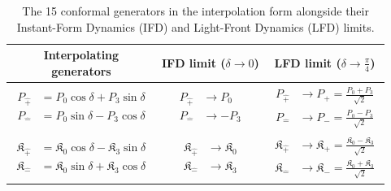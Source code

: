 \documentclass[foundations,article,submit,pdftex,moreauthors]{Definitions/mdpi}
\begin{document}
\begin{table}[htpb!]
\centering
\renewcommand{\arraystretch}{2} %
\caption{The 15 conformal generators in the interpolation form alongside their Instant-Form Dynamics (IFD) and Light-Front Dynamics (LFD) limits.}
\label{tab:generator_limits}
\begin{tabular}{@{}ccc@{}}
\toprule
\makecell{\textbf{Interpolating} \\ \textbf{generators}} & 
\makecell{\textbf{IFD limit} \\ ($\delta \to 0$)} & 
\makecell{\textbf{LFD limit} \\ ($\delta \to \frac{\pi}{4}$)} \\
\midrule

$\begin{aligned}
P_{\hat{+}} &= P_0\cos\delta + P_3\sin\delta \\
P_{\hat{-}} &= P_0\sin\delta - P_3\cos\delta
\end{aligned}$ &
$\begin{aligned}
P_{\hat{+}} &\to P_0 \\
P_{\hat{-}} &\to -P_3
\end{aligned}$ &
$\begin{aligned}
P_{\hat{+}} &\to P_{+} = \frac{P_0 + P_3}{\sqrt{2}} \\
P_{\hat{-}} &\to P_{-} = \frac{P_0 - P_3}{\sqrt{2}}
\end{aligned}$ \\

\midrule

$\begin{aligned}
\mathfrak{K}_{\hat{+}} &= \mathfrak{K}_0\cos\delta - \mathfrak{K}_3\sin\delta \\
\mathfrak{K}_{\hat{-}} &= \mathfrak{K}_0\sin\delta + \mathfrak{K}_3\cos\delta
\end{aligned}$ &
$\begin{aligned}
\mathfrak{K}_{\hat{+}} &\to \mathfrak{K}_0 \\
\mathfrak{K}_{\hat{-}} &\to \mathfrak{K}_3
\end{aligned}$ &
$\begin{aligned}
\mathfrak{K}_{\hat{+}} &\to \mathfrak{K}_{+} = \frac{\mathfrak{K}_0 - \mathfrak{K}_3}{\sqrt{2}} \\
\mathfrak{K}_{\hat{-}} &\to \mathfrak{K}_{-} = \frac{\mathfrak{K}_0 + \mathfrak{K}_3}{\sqrt{2}}
\end{aligned}$ \\


\end{tabular}
\end{table}
\end{document}

